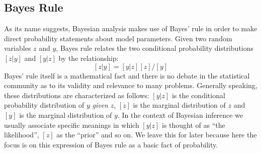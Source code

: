 \subsection{Bayes Rule}

As its name suggests, Bayesian analysis makes use of Bayes' rule in
order to make direct probability statements about model
parameters. Given two random variables $z$ and $y$, Bayes rule relates
the two conditional probability distributions $[z|y]$ and $[y|z]$ by
the relationship:
\[
[z|y] = [y|z][z]/[y]
\]
Bayes' rule itself is a mathematical fact and there is no debate in
the statistical community as to its validity and relevance to many
problems. Generally speaking, these distributions are characterized as
follows: $[y|z]$ is the conditional probability distribution of $y$
{\it given} $z$, $[z]$ is the marginal distribution of $z$ and $[y]$
is the marginal distribution of $y$. In the context of Bayesian
inference we usually associate specific meanings in which $[y|z]$ is
thought of as ``the likelihood'', $[z]$ as the ``prior'' and so on. We
leave this for later because here the focus is on this expression of
Bayes rule as a basic fact of probability. 

